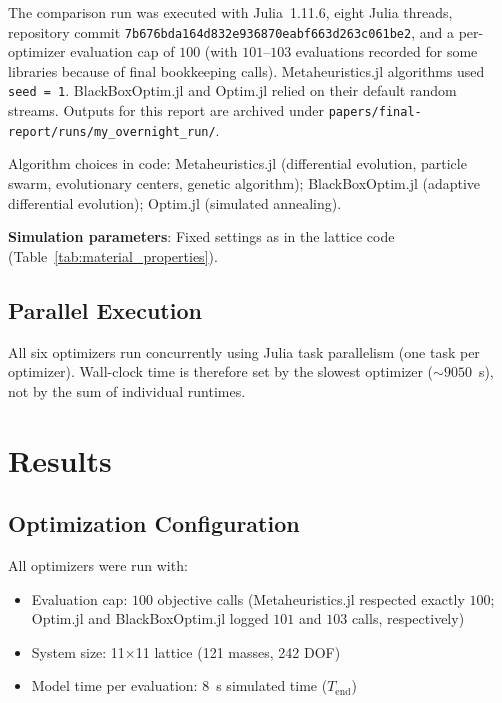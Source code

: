 \documentclass[11pt,a4paper]{article}
\begin{document}
\noindent The comparison run was executed with Julia~1.11.6, eight Julia threads, repository commit \texttt{7b676bda164d832e936870eabf663d263c061be2}, and a per-optimizer evaluation cap of $100$ (with $101$--$103$ evaluations recorded for some libraries because of final bookkeeping calls). Metaheuristics.jl algorithms used \texttt{seed = 1}. BlackBoxOptim.jl and Optim.jl relied on their default random streams. Outputs for this report are archived under \texttt{papers/final-report/runs/my\_overnight\_run/}. \newline

\noindent Algorithm choices in code: Metaheuristics.jl (differential evolution, particle swarm, evolutionary centers, genetic algorithm); BlackBoxOptim.jl (adaptive differential evolution); Optim.jl (simulated annealing). \newline

\noindent \textbf{Simulation parameters}: Fixed settings as in the lattice code (Table~\ref{tab:material_properties}).

\subsection{Parallel Execution}

\noindent All six optimizers run concurrently using Julia task parallelism (one task per optimizer). Wall-clock time is therefore set by the slowest optimizer ($\sim 9050$~s), not by the sum of individual runtimes.

\section{Results}
\label{sec:results}

\subsection{Optimization Configuration}

\noindent All optimizers were run with:
\begin{itemize}
    \item Evaluation cap: $100$ objective calls (Metaheuristics.jl respected exactly $100$; Optim.jl and BlackBoxOptim.jl logged $101$ and $103$ calls, respectively)
    \item System size: 11×11 lattice (121 masses, 242 DOF)
    \item Model time per evaluation: $8$~s simulated time ($T_{\mathrm{end}}$)
\end{itemize}
\end{document}
